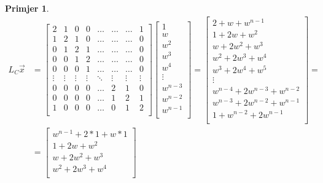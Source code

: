 \documentclass[11pt]{article}
\newtheorem{example}{Primjer}
\begin{document}
\begin{example}
	\[
	\begin{split}
	  	L_C \vec{x} & = 
		\begin{bmatrix}
		2 & 1 & 0 & 0 & \dots & \dots & \dots & 1 \\
		1 & 2 & 1 & 0 & \dots & \dots & \dots & 0 \\
		0 & 1 & 2 & 1 & \dots & \dots & \dots & 0 \\
		0 & 0 & 1 & 2 & \dots & \dots & \dots & 0 \\
		0 & 0 & 0 & 1 & \dots & \dots & \dots & 0 \\
		\vdots  & \vdots  & \vdots  & \vdots  & \ddots & \vdots & \vdots & \vdots  \\
		0 & 0 & 0 & 0 & \dots & 2 & 1 & 0 \\
		0 & 0 & 0 & 0 & \dots & 1 & 2 & 1 \\
		1 & 0 & 0 & 0 & \dots & 0 & 1 & 2 \\
		\end{bmatrix}
		 \begin{bmatrix}
		1 \\
		w \\
		w^2 \\
		w^3 \\
		w^4 \\
		\vdots \\
		w^{n-3} \\
		w^{n-2} \\
		w^{n-1} \\
		\end{bmatrix} 
		=
		\begin{bmatrix}
		 2 + w + w^{n-1} \\
		1 + 2w + w^2 \\
		w + 2w^2 + w^3 \\
		w^2 + 2w^3 + w^4 \\
		w^3 + 2w^4 + w^5 \\
		\vdots \\
		w^{n-4} + 2w^{n-3} + w^{n-2} \\
		w^{n-3} + 2w^{n-2} + w^{n-1} \\
		1 + w^{n-2} + 2w^{n-1} \\
		\end{bmatrix} = \\
	 	 & =  
		\begin{bmatrix}
		 w^{n-1} + 2 * 1 + w * 1 \\
		1 + 2w + w^2       \\
		w + 2w^2 + w^3       \\
		w^2 + 2w^3 + w^4  \\

\end{bmatrix}
\end{split}\]
\end{example}
\end{document}
